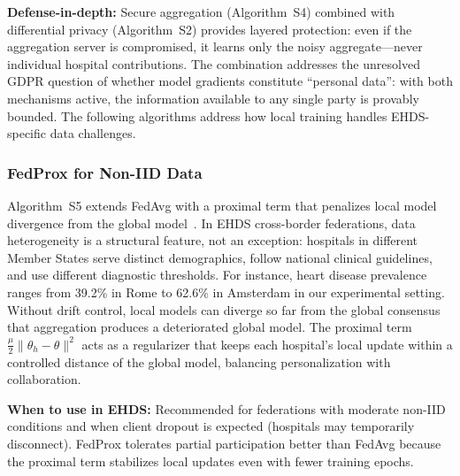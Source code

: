 \documentclass[conference]{IEEEtran}
\begin{document}
\textbf{Defense-in-depth:} Secure aggregation (Algorithm~S4) combined with differential privacy (Algorithm~S2) provides layered protection: even if the aggregation server is compromised, it learns only the noisy aggregate---never individual hospital contributions. The combination addresses the unresolved GDPR question of whether model gradients constitute ``personal data'': with both mechanisms active, the information available to any single party is provably bounded. The following algorithms address how local training handles EHDS-specific data challenges.

\subsubsection{FedProx for Non-IID Data}

Algorithm~S5 extends FedAvg with a proximal term that penalizes local model divergence from the global model~\cite{li2020federated}. In EHDS cross-border federations, data heterogeneity is a structural feature, not an exception: hospitals in different Member States serve distinct demographics, follow national clinical guidelines, and use different diagnostic thresholds. For instance, heart disease prevalence ranges from 39.2\% in Rome to 62.6\% in Amsterdam in our experimental setting. Without drift control, local models can diverge so far from the global consensus that aggregation produces a deteriorated global model. The proximal term $\frac{\mu}{2}\|\theta_h - \theta\|^2$ acts as a regularizer that keeps each hospital's local update within a controlled distance of the global model, balancing personalization with collaboration.

\textbf{When to use in EHDS:} Recommended for federations with moderate non-IID conditions and when client dropout is expected (hospitals may temporarily disconnect). FedProx tolerates partial participation better than FedAvg because the proximal term stabilizes local updates even with fewer training epochs.
\end{document}
